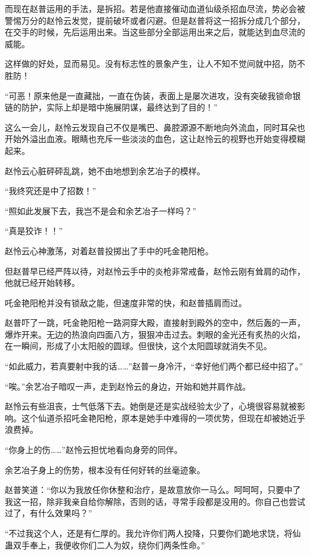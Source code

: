 \begin{this_body}
而现在赵普运用的手法，是拆招。若是他直接催动血道仙级杀招血尽流，势必会被警惕万分的赵怜云发觉，提前破坏或者闪避。但是赵普将这一招拆分成几个部分，在交手的时候，先后运用出来。当这些部分全部运用出来之后，就能达到血尽流的威能。

这样做的好处，显而易见。没有标志性的景象产生，让人不知不觉间就中招，防不胜防！

“可恶！原来他是一直藏拙，一直在伪装，表面上是屡次进攻，没有突破我锁命银链的防护，实际上却是暗中施展阴谋，最终达到了目的！”

这么一会儿，赵怜云发现自己不仅是嘴巴、鼻腔源源不断地向外流血，同时耳朵也开始外溢出血液。眼睛也充斥一些淡淡的血色，这让赵怜云的视野也开始变得模糊起来。

赵怜云心脏砰砰乱跳，她不由地想到余艺冶子的模样。

“我终究还是中了招数！”

“照如此发展下去，我岂不是会和余艺冶子一样吗？”

“真是狡诈！！”

赵怜云心神激荡，对着赵普投掷出了手中的吒金艳阳枪。

但赵普早已经严阵以待，对赵怜云手中的炎枪非常戒备，赵怜云刚有耸肩的动作，他就已经开始转移。

吒金艳阳枪并没有锁敌之能，但速度非常的快，和赵普插肩而过。

赵普吓了一跳，吒金艳阳枪一路洞穿大殿，直接射到殿外的空中，然后轰的一声，爆炸开来。无边的热浪向四面八方，狠狠冲击过去。刺眼的金光还有炙热的火焰，在一瞬间，形成了小太阳般的圆球。但很快，这个太阳圆球就消失不见。

“如此威力，若真要射中我的话……”赵普一身冷汗，“幸好他们两个都已经中招了。”

“唉。”余艺冶子暗叹一声，走到赵怜云的身边，开始和她并肩作战。

赵怜云有些沮丧，士气低落下去。她倒是还是实战经验太少了，心境很容易就被影响。这个仙道杀招吒金艳阳枪，原本是她手中难得的一项优势，但现在却被她近乎浪费掉。

“你身上的伤……”赵怜云担忧地看向身旁的同伴。

余艺冶子身上的伤势，根本没有任何好转的丝毫迹象。

赵普笑道：“你以为我放任你休整和治疗，是故意放你一马么。呵呵呵，只要中了我这一招，除非我亲自给你解除，否则的话，寻常手段都是没用的。你自己也尝试过了，有什么效果吗？”

“不过我这个人，还是有仁厚的。我允许你们两人投降，只要你们跪地求饶，将仙蛊双手奉上，我便收你们二人为奴，绕你们两条性命。”


\end{this_body}
